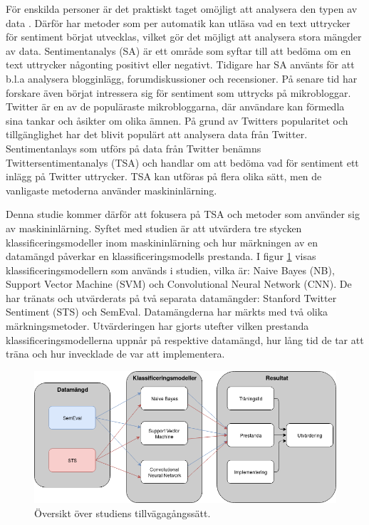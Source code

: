 \documentclass{kaumasters} %
\begin{document}
För enskilda personer är det praktiskt taget omöjligt att analysera den typen av data \cite{TSAsurvey}. Därför har metoder som per automatik kan utläsa vad en text uttrycker för sentiment börjat utvecklas, vilket gör det möjligt att analysera stora mängder av data. Sentimentanalys (SA) är ett område som syftar till att bedöma om en text uttrycker någonting positivt eller negativt. Tidigare har SA använts för att b.l.a analysera blogginlägg, forumdiskussioner och recensioner. På senare tid har forskare även börjat intressera sig för sentiment som uttrycks på mikrobloggar. Twitter är en av de populäraste mikrobloggarna, där användare kan förmedla sina tankar och åsikter om olika ämnen. På grund av Twitters popularitet och tillgänglighet har det blivit populärt att analysera data från Twitter. Sentimentanlays som utförs på data från Twitter benämns Twittersentimentanalys (TSA) och handlar om att bedöma vad för sentiment ett inlägg på Twitter uttrycker.  TSA kan utföras på flera olika sätt, men de vanligaste metoderna använder maskininlärning.


Denna studie kommer därför att fokusera på TSA och metoder som använder sig av maskininlärning. Syftet med studien är att utvärdera tre stycken klassificeringsmodeller inom maskininlärning och hur märkningen av en datamängd påverkar en klassificeringsmodells prestanda. I figur \ref{fig:helhet} visas klassificeringsmodellern som används i studien, vilka är: Naive Bayes (NB), Support Vector Machine (SVM) och Convolutional Neural Network (CNN). De har tränats och utvärderats på två separata datamängder: Stanford Twitter Sentiment (STS) och SemEval. Datamängderna har märkts med två olika märkningsmetoder. Utvärderingen har gjorts utefter vilken prestanda klassificeringsmodellerna uppnår på respektive datamängd, hur lång tid de tar att träna och hur invecklade de var att implementera. 

\begin{figure}[h]
\includegraphics[width=14cm]{helthetsbild}
\centering
\caption{Översikt över studiens tillvägagångssätt.}
\label{fig:helhet}
\end{figure}
\end{document}
